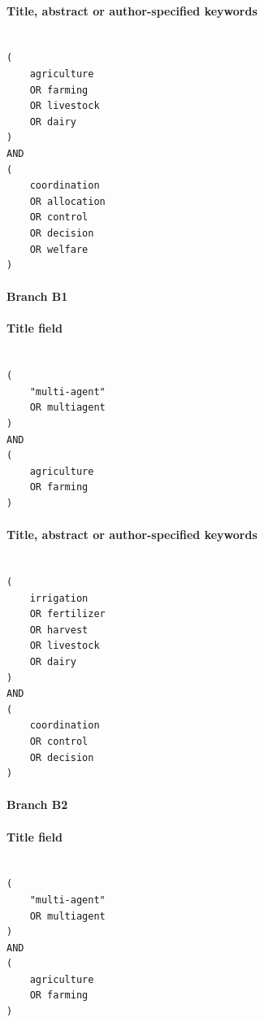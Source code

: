 \paragraph{Title, abstract or author-specified keywords}

\begin{lstlisting}

(
    agriculture
    OR farming
    OR livestock
    OR dairy
)
AND
(
    coordination
    OR allocation
    OR control
    OR decision
    OR welfare
)

\end{lstlisting}

\paragraph{Branch B1}

\paragraph{Title field}

\begin{lstlisting}

(
    "multi-agent"
    OR multiagent
)
AND
(
    agriculture
    OR farming
)

\end{lstlisting}

\paragraph{Title, abstract or author-specified keywords}

\begin{lstlisting}

(
    irrigation
    OR fertilizer
    OR harvest
    OR livestock
    OR dairy
)
AND
(
    coordination
    OR control
    OR decision
)

\end{lstlisting}

\paragraph{Branch B2}

\paragraph{Title field}

\begin{lstlisting}

(
    "multi-agent"
    OR multiagent
)
AND
(
    agriculture
    OR farming
)

\end{lstlisting}


